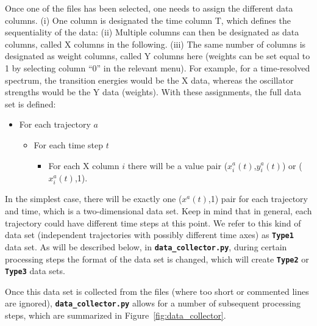 \documentclass[a4paper,10pt,DIV=15,openany,twoside=false]{scrbook}
\newcommand{\ttt}[1]{\textbf{\texttt{#1}}}
\begin{document}
Once one of the files has been selected, one needs to assign the different data columns.
(i) One column is designated the time column T, which defines the sequentiality of the data:
(ii) Multiple columns can then be designated as data columns, called X columns in the following.
(iii) The same number of columns is designated as weight columns, called Y columns here (weights can be set equal to 1 by selecting column ``0'' in the relevant menu).
For example, for a time-resolved spectrum, the transition energies would be the X data, whereas the oscillator strengths would be the Y data (weights).
With these assignments, the full data set is defined:
\begin{itemize}
  \item For each trajectory $a$
  \begin{itemize}
    \item For each time step $t$
    \begin{itemize}
      \item For each X column $i$ there will be a value pair ($x^a_i(t)$,$y^a_i(t)$) or ($x^a_i(t)$,1).
    \end{itemize}
  \end{itemize}
\end{itemize}
In the simplest case, there will be exactly one ($x^a(t)$,1) pair for each trajectory and time, which is a two-dimensional data set.
Keep in mind that in general, each trajectory could have different time steps at this point.
We refer to this kind of data set (independent trajectories with possibly different time axes) as \ttt{Type1} data set.
As will be described below, in \ttt{data\_collector.py}, during certain processing steps the format of the data set is changed, which will create \ttt{Type2} or \ttt{Type3} data sets.

Once this data set is collected from the files (where too short or commented lines are ignored), \ttt{data\_collector.py} allows for a number of subsequent processing steps, which are summarized in Figure~\ref{fig:data_collector}.
\end{document}
